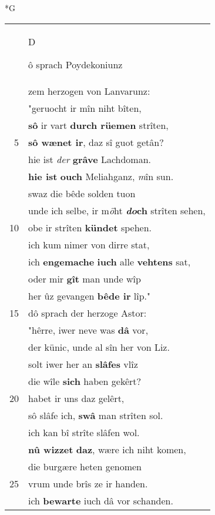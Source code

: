\documentclass[8pt,a4paper,notitlepage]{article}
\begin{document}
\newpage
\begin{table}[ht]
\begin{minipage}[t]{0.5\linewidth}
\small
\begin{center}*G
\end{center}
\begin{tabular}{rl}
 & \begin{large}D\end{large}ô sprach Poydekoniunz\\ 
 & zem herzogen von Lanvarunz:\\ 
 & "geruocht ir mîn niht bîten,\\ 
 & \textbf{sô} ir vart \textbf{durch rüemen} strîten,\\ 
5 & \textbf{sô wænet ir}, daz sî guot getân?\\ 
 & hie ist \textit{der} \textbf{grâve} Lachdoman.\\ 
 & \textbf{hie ist} \textbf{ouch} Meliahganz, \textit{m}în sun.\\ 
 & swaz die bêde solden tuon\\ 
 & unde ich selbe, ir m\textit{ö}ht \textbf{\textit{do}ch} strîten sehen,\\ 
10 & obe ir strîten \textbf{kündet} spehen.\\ 
 & ich kum nimer von dirre stat,\\ 
 & ich \textbf{en}\textbf{gemache} \textbf{iuch} alle \textbf{vehtens} sat,\\ 
 & oder mir \textbf{gît} man unde wîp\\ 
 & her ûz gevangen \textbf{bêde ir} lîp."\\ 
15 & dô sprach der herzoge Astor:\\ 
 & "hêrre, iwer neve was \textbf{dâ} vor,\\ 
 & der künic, unde al sîn her von Liz.\\ 
 & solt iwer her an \textbf{slâfes} vlîz\\ 
 & die wîle \textbf{sich} haben gekêrt?\\ 
20 & habet ir uns daz gelêrt,\\ 
 & sô slâfe ich, \textbf{swâ} man strîten sol.\\ 
 & ich kan bî strîte slâfen wol.\\ 
 & \textbf{nû wizzet} \textbf{daz}, wære ich niht komen,\\ 
 & die burgære heten genomen\\ 
25 & vrum unde brîs ze ir handen.\\ 
 & ich \textbf{bewarte} iuch dâ vor schanden.\\ 

\end{tabular}
\end{minipage}
\end{table}
\end{document}
